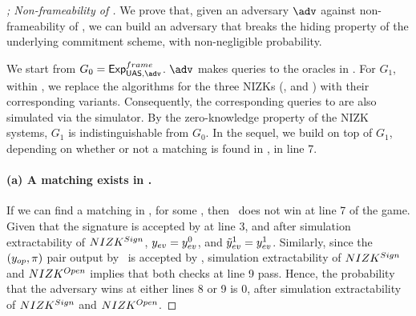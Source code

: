 \begin{proof}[; Non-frameability of \CUASGen]
  We prove that, given an adversary $\adv$ against non-frameability of
  \CUASGen, we can build an adversary \advB that breaks the hiding property of
  the underlying commitment scheme, with non-negligible probability.

  We start from $G_0=\ExpNonframe$. $\adv$ makes queries to the oracles in
  \Oframe. For $G_1$, within \Setup, we replace the \Setup algorithms for the
  three NIZKs (\Issue, \Sign and \Open) with their corresponding \SimSetup
  variants. Consequently, the corresponding queries to \Prove are also
  simulated via the simulator. By the zero-knowledge property of the NIZK
  systems, $G_1$ is indistinguishable from $G_0$. In the sequel, we build on
  top of $G_1$, depending on whether or not a matching \Sig is found in \SIG,
  in line 7.

  \paragraph{(a) A matching \Sig exists in \SIG.} %
  If we can find a matching \Sig in \SIG, for some \uid, then \adv~does not win
  at line 7 of the game. Given that the signature is accepted by \Verify at line
  3, and after simulation extractability of $NIZK^{Sign}$, $y_{ev} =
  y_{ev}^0$, and $\tilde{y}_{ev}^1 = y_{ev}^1$. Similarly, since the $(y_{op},\pi)$
  pair output by \adv~is accepted by \Judge, simulation extractability of
  $NIZK^{Sign}$ and $NIZK^{Open}$ implies that both checks at line 9 pass.
  Hence, the probability that the adversary wins at either lines 8 or 9 is $0$,
  after simulation extractability of $NIZK^{Sign}$ and $NIZK^{Open}$.


\end{proof}
